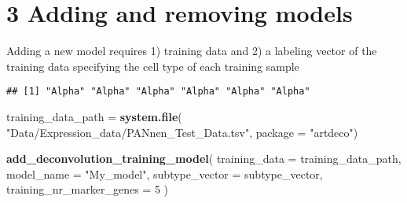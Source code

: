 \documentclass[]{article}
\newenvironment{Shaded}{\begin{snugshade}}{\end{snugshade}}
\newcommand{\KeywordTok}[1]{\textcolor[rgb]{0.13,0.29,0.53}{\textbf{#1}}}
\newcommand{\DataTypeTok}[1]{\textcolor[rgb]{0.13,0.29,0.53}{#1}}
\newcommand{\DecValTok}[1]{\textcolor[rgb]{0.00,0.00,0.81}{#1}}
\newcommand{\CharTok}[1]{\textcolor[rgb]{0.31,0.60,0.02}{#1}}
\newcommand{\StringTok}[1]{\textcolor[rgb]{0.31,0.60,0.02}{#1}}
\newcommand{\CommentTok}[1]{\textcolor[rgb]{0.56,0.35,0.01}{\textit{#1}}}
\newcommand{\OperatorTok}[1]{\textcolor[rgb]{0.81,0.36,0.00}{\textbf{#1}}}
\newcommand{\NormalTok}[1]{#1}
\begin{document}
\section{3 Adding and removing models}\label{adding-and-removing-models}

Adding a new model requires 1) training data and 2) a labeling vector of
the training data specifying the cell type of each training sample

\begin{Shaded}
\end{Shaded}

\begin{verbatim}
## [1] "Alpha" "Alpha" "Alpha" "Alpha" "Alpha" "Alpha"
\end{verbatim}

\begin{Shaded}
\begin{Highlighting}[]
\NormalTok{training_data_path =}\StringTok{ }\KeywordTok{system.file}\NormalTok{(}
    \StringTok{"Data/Expression_data/PANnen_Test_Data.tsv"}\NormalTok{, }\DataTypeTok{package =} \StringTok{"artdeco"}\NormalTok{)}

\KeywordTok{add_deconvolution_training_model}\NormalTok{(}
    \DataTypeTok{training_data =}\NormalTok{ training_data_path,}
    \DataTypeTok{model_name =} \StringTok{"My_model"}\NormalTok{,}
    \DataTypeTok{subtype_vector =}\NormalTok{ subtype_vector,}
    \DataTypeTok{training_nr_marker_genes =} \DecValTok{5}
\NormalTok{)}
\end{Highlighting}
\end{Shaded}
\end{document}
